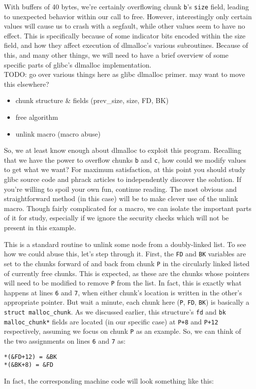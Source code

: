 With buffers of 40 bytes, we're certainly overflowing chunk \texttt{b}'s
\texttt{size} field, leading to unexpected behavior within our call to free.
However, interestingly only certain values will cause us to crash with a segfault,
while other values seem to have no effect. This is specifically because of 
some indicator bits encoded within the size field, and how they affect execution
of dlmalloc's various subroutines. Because of this, and many other things, we will
need to have a brief overview of some specific parts of glibc's dlmalloc implementation.\\

TODO: go over various things here as glibc dlmalloc primer. may want to move this elsewhere?
\begin{itemize}
	\item chunk structure \& fields (prev\_size, size, FD, BK)
	\item free algorithm
	\item unlink macro (macro abuse)
\end{itemize}


So, we at least know enough about dlmalloc to exploit this program. Recalling
that we have the power to overflow chunks \texttt{b} and \texttt{c}, how
could we modify values to get what we want? For maximum satisfaction, at this 
point you should study glibc source code and phrack articles to independently
discover the solution. If you're willing to spoil your own fun, continue reading.
The most obvious and straightforward 
method (in this case) will be to make clever use of the unlink macro. Though
fairly complicated for a macro, we can isolate the important parts of it for study,
especially if we ignore the security checks which will not be present in this example.



This is a standard routine to unlink some node from a doubly-linked list.
To see how we could abuse this, let's step through it. First, the 
\texttt{FD} and \texttt{BK} variables are set to the chunks forward of and
back from chunk \texttt{P} in the circularly linked listed of currently
free chunks. This is expected, as these are the chunks whose pointers
will need to be modified to remove \texttt{P} from the list. In fact,
this is exactly what happens at lines \texttt{6} and \texttt{7}, when
either chunk's location is written in the other's appropriate pointer.
But wait a minute, each chunk here (\texttt{P}, \texttt{FD}, \texttt{BK})
is basically a \texttt{struct malloc\_chunk}. As we discussed earlier,
this structure's \texttt{fd} and \texttt{bk} \texttt{malloc\_chunk*}
fields are located (in our specific case) at \texttt{P+8} and 
\texttt{P+12} respectively, assuming we focus on chunk \texttt{P} as an example.
So, we can think of the two assignments on lines \texttt{6} and \texttt{7}
as:
\begin{lstlisting}
*(&FD+12) = &BK
*(&BK+8) = &FD
\end{lstlisting}
In fact, the corresponding machine code will look something like this:

